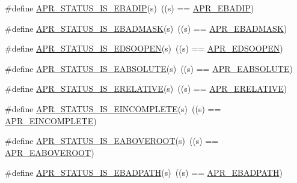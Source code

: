 \begin{DoxyCompactItemize}
\item 
\#define \hyperlink{group___a_p_r___s_t_a_t_u_s___i_s_ga02d9309a113e07050308af66e955d600}{A\-P\-R\-\_\-\-S\-T\-A\-T\-U\-S\-\_\-\-I\-S\-\_\-\-E\-B\-A\-D\-I\-P}(s)~((s) == \hyperlink{group___a_p_r___error_ga96180fb8075ae0150bfed50c2e7f7a59}{A\-P\-R\-\_\-\-E\-B\-A\-D\-I\-P})
\item 
\#define \hyperlink{group___a_p_r___s_t_a_t_u_s___i_s_gabec95c93d0c5996f14a94e2cc37e1904}{A\-P\-R\-\_\-\-S\-T\-A\-T\-U\-S\-\_\-\-I\-S\-\_\-\-E\-B\-A\-D\-M\-A\-S\-K}(s)~((s) == \hyperlink{group___a_p_r___error_ga5249b5edc27466f6b60b3dfa1541ba31}{A\-P\-R\-\_\-\-E\-B\-A\-D\-M\-A\-S\-K})
\item 
\#define \hyperlink{group___a_p_r___s_t_a_t_u_s___i_s_gae87f4877aa35535eb3546b499ef9d9f3}{A\-P\-R\-\_\-\-S\-T\-A\-T\-U\-S\-\_\-\-I\-S\-\_\-\-E\-D\-S\-O\-O\-P\-E\-N}(s)~((s) == \hyperlink{group___a_p_r___error_gac96fbde76282364e8c482d6f23bc61bb}{A\-P\-R\-\_\-\-E\-D\-S\-O\-O\-P\-E\-N})
\item 
\#define \hyperlink{group___a_p_r___s_t_a_t_u_s___i_s_gae662804298416a68e63c4f84f245d30c}{A\-P\-R\-\_\-\-S\-T\-A\-T\-U\-S\-\_\-\-I\-S\-\_\-\-E\-A\-B\-S\-O\-L\-U\-T\-E}(s)~((s) == \hyperlink{group___a_p_r___error_gafd1ffc5bf2bf215ad048780408913d0e}{A\-P\-R\-\_\-\-E\-A\-B\-S\-O\-L\-U\-T\-E})
\item 
\#define \hyperlink{group___a_p_r___s_t_a_t_u_s___i_s_ga7a8fca5102890e9a0bc4133ba848d52c}{A\-P\-R\-\_\-\-S\-T\-A\-T\-U\-S\-\_\-\-I\-S\-\_\-\-E\-R\-E\-L\-A\-T\-I\-V\-E}(s)~((s) == \hyperlink{group___a_p_r___error_gae4688dfa866265b9ec3623689c23923b}{A\-P\-R\-\_\-\-E\-R\-E\-L\-A\-T\-I\-V\-E})
\item 
\#define \hyperlink{group___a_p_r___s_t_a_t_u_s___i_s_gae7354f40a912dc43fe76ba2a59de0403}{A\-P\-R\-\_\-\-S\-T\-A\-T\-U\-S\-\_\-\-I\-S\-\_\-\-E\-I\-N\-C\-O\-M\-P\-L\-E\-T\-E}(s)~((s) == \hyperlink{group___a_p_r___error_gab4357bcbdc2922183e0594865b59ce58}{A\-P\-R\-\_\-\-E\-I\-N\-C\-O\-M\-P\-L\-E\-T\-E})
\item 
\#define \hyperlink{group___a_p_r___s_t_a_t_u_s___i_s_gae89b8de1e40b855cf95987ce5947b442}{A\-P\-R\-\_\-\-S\-T\-A\-T\-U\-S\-\_\-\-I\-S\-\_\-\-E\-A\-B\-O\-V\-E\-R\-O\-O\-T}(s)~((s) == \hyperlink{group___a_p_r___error_ga4828cc04f97dc7bed691456adf7c073e}{A\-P\-R\-\_\-\-E\-A\-B\-O\-V\-E\-R\-O\-O\-T})
\item 
\#define \hyperlink{group___a_p_r___s_t_a_t_u_s___i_s_ga0758d7227209e4311c843c752c0dd075}{A\-P\-R\-\_\-\-S\-T\-A\-T\-U\-S\-\_\-\-I\-S\-\_\-\-E\-B\-A\-D\-P\-A\-T\-H}(s)~((s) == \hyperlink{group___a_p_r___error_ga1731292eb3e3cdc801d3bf0b09cd8da7}{A\-P\-R\-\_\-\-E\-B\-A\-D\-P\-A\-T\-H})

\end{DoxyCompactItemize}
